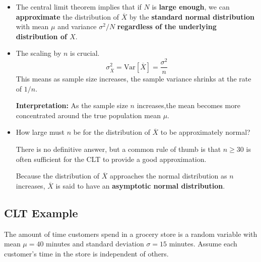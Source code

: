 \documentclass[
  12pt,
  a4paper,
]{scrbook}
\theoremstyle{plain}
\theoremstyle{definition}
\theoremstyle{remark}
\begin{document}
\begin{itemize}
\item
  The central limit theorem implies that if \(N\) is \textbf{large
  enough}, we can \textbf{approximate} the distribution of
  \(\overline{X}\) by the {\textbf{standard normal distribution}} with
  mean \(\mu\) and variance \(\sigma^2 / N\) \textbf{regardless of the
  underlying distribution of \(X.\)}
\item
  The scaling by {\(n\)} is crucial. \[
  \sigma_{\overline{X}}^2 = \text{Var}[\overline{X}] = \frac{\sigma^2}{n}
  \] This means as sample size increases, the sample variance shrinks at
  the rate of \(1/n\).

  \begin{tcolorbox}[enhanced jigsaw, arc=.35mm, bottomrule=.15mm, bottomtitle=1mm, breakable, colback=white, colbacktitle=quarto-callout-tip-color!10!white, colframe=quarto-callout-tip-color-frame, coltitle=black, left=2mm, leftrule=.75mm, opacityback=0, opacitybacktitle=0.6, rightrule=.15mm, title=\textcolor{quarto-callout-tip-color}{\faLightbulb}\hspace{0.5em}{Tip}, titlerule=0mm, toprule=.15mm, toptitle=1mm]

  \textbf{Interpretation:} As the sample size \(n\) increases,the mean
  becomes more concentrated around the true population mean \(\mu\).

  \end{tcolorbox}
\item
  How large must \(n\) be for the distribution of \(\overline{X}\) to be
  approximately normal?

  There is no definitive answer, but a common rule of thumb is that
  \(n \geq 30\) is often sufficient for the CLT to provide a good
  approximation.

  Because the distribution of \(\overline{X}\) approaches the normal
  distribution as \(n\) increases, \(\overline{X}\) is said to have an
  {\textbf{asymptotic normal distribution}}.
\end{itemize}

\subsection{CLT Example}\label{clt-example}

The amount of time customers spend in a grocery store is a random
variable with mean \(\mu = 40\) minutes and standard deviation
\(\sigma = 15\) minutes. Assume each customer's time in the store is
independent of others.
\end{document}
